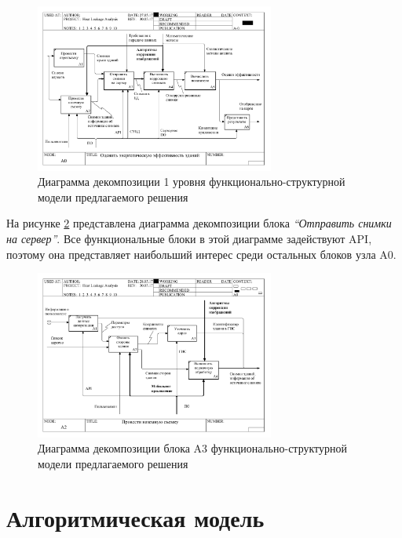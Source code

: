 	\begin{figure}[t!]
      \centering
      \includegraphics[width=0.7\textwidth]{images/fsm/1}
      \caption{Диаграмма декомпозиции 1 уровня функционально-структурной модели предлагаемого решения}
      \label{fsm:1}
    \end{figure}

\par
    На рисунке \ref{fsm:2} представлена диаграмма декомпозиции блока \textit{“Отправить снимки на сервер”}. Все функциональные блоки в этой диаграмме задействуют API, поэтому она представляет наибольший интерес среди остальных блоков узла A0.

    \begin{figure}[h!]
      \centering
      \includegraphics[width=0.7\textwidth]{images/fsm/2}
      \caption{Диаграмма декомпозиции блока A3 функционально-структурной модели предлагаемого решения}
      \label{fsm:2}
    \end{figure}

\pagebreak

\section{Алгоритмическая модель}
\label{sec:models:algo}
	
